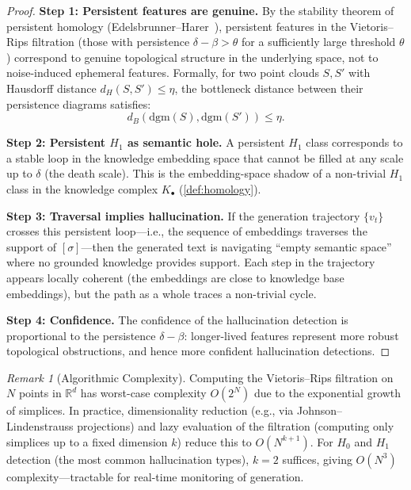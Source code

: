 \documentclass[11pt,a4paper]{article}
\theoremstyle{plain}
\theoremstyle{definition}
\theoremstyle{remark}
\newtheorem{remark}[theorem]{Remark}
\newcommand{\R}{\mathbb{R}}
\begin{document}
\begin{proof}
\textbf{Step 1: Persistent features are genuine.} By the stability theorem of persistent homology (Edelsbrunner--Harer~\cite{edelsbrunner2010}), persistent features in the Vietoris--Rips filtration (those with persistence $\delta - \beta > \theta$ for a sufficiently large threshold $\theta$) correspond to genuine topological structure in the underlying space, not to noise-induced ephemeral features. Formally, for two point clouds $S, S'$ with Hausdorff distance $d_H(S, S') \leq \eta$, the bottleneck distance between their persistence diagrams satisfies:
\[
d_B(\mathrm{dgm}(S), \mathrm{dgm}(S')) \leq \eta.
\]

\textbf{Step 2: Persistent $H_1$ as semantic hole.} A persistent $H_1$ class corresponds to a stable loop in the knowledge embedding space that cannot be filled at any scale up to $\delta$ (the death scale). This is the embedding-space shadow of a non-trivial $H_1$ class in the knowledge complex $K_\bullet$ (\cref{def:homology}).

\textbf{Step 3: Traversal implies hallucination.} If the generation trajectory $\{v_t\}$ crosses this persistent loop---i.e., the sequence of embeddings traverses the support of $[\sigma]$---then the generated text is navigating ``empty semantic space'' where no grounded knowledge provides support. Each step in the trajectory appears locally coherent (the embeddings are close to knowledge base embeddings), but the path as a whole traces a non-trivial cycle.

\textbf{Step 4: Confidence.} The confidence of the hallucination detection is proportional to the persistence $\delta - \beta$: longer-lived features represent more robust topological obstructions, and hence more confident hallucination detections.
\end{proof}

\begin{remark}[Algorithmic Complexity]
\label{rem:complexity}
Computing the Vietoris--Rips filtration on $N$ points in $\R^d$ has worst-case complexity $O(2^N)$ due to the exponential growth of simplices. In practice, dimensionality reduction (e.g., via Johnson--Lindenstrauss projections) and lazy evaluation of the filtration (computing only simplices up to a fixed dimension $k$) reduce this to $O(N^{k+1})$. For $H_0$ and $H_1$ detection (the most common hallucination types), $k = 2$ suffices, giving $O(N^3)$ complexity---tractable for real-time monitoring of generation.
\end{remark}
\end{document}
